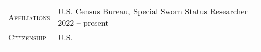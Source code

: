 \documentclass[11pt]{article}
\newcommand{\xspace}{19pt}
\begin{document}
\begin{tabularx}{\textwidth}{@{}Y Z@{}}
	\textsc{Affiliations}  & 
	U.S. Census Bureau, Special Sworn Status Researcher \hfill 2022 -- present%
	\\ \addlinespace[\xspace] 
	
	\textsc{Citizenship} & 
	U.S.
	\\ \addlinespace[\xspace] 
	

\end{tabularx}
\end{document}
